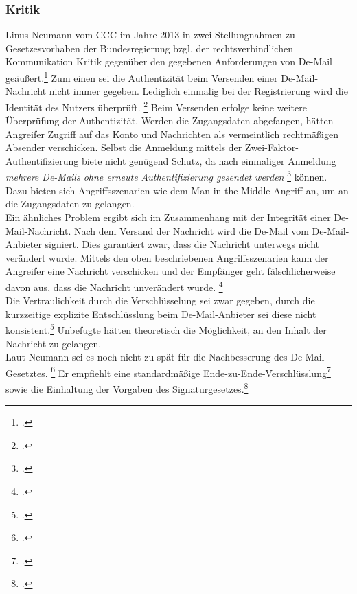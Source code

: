 \documentclass  [paper=a4,
				fontsize=12pt,
				listof=totoc,
				bibliography=totoc
				]{scrreprt}
\begin{document}
{			\subsubsection{Kritik}
			Linus Neumann vom \ac{CCC} im Jahre 2013 in zwei Stellungnahmen zu Gesetzesvorhaben der Bundesregierung bzgl. der rechtsverbindlichen Kommunikation Kritik gegenüber den gegebenen Anforderungen von De-Mail geäußert.\footcite[Vgl.][]{Neumann2013a,Neumann2013b} %
			Zum einen sei die Authentizität beim Versenden einer De-Mail-Nachricht nicht immer gegeben. Lediglich einmalig bei der Registrierung wird die Identität des Nutzers überprüft. \footcite[Vgl.][]{Neumann2013b} 
			Beim Versenden erfolge keine weitere Überprüfung der Authentizität.
			Werden die Zugangsdaten abgefangen, hätten Angreifer Zugriff auf das Konto und Nachrichten als vermeintlich rechtmäßigen Absender verschicken.
			Selbst die Anmeldung mittels der Zwei-Faktor-Authentifizierung biete nicht genügend Schutz, da nach einmaliger Anmeldung \textit{\glqq mehrere De-Mails ohne erneute Authentifizierung gesendet werden\grqq} \footcite[Vgl.][o.S.]{Neumann2013b} können.
			Dazu bieten sich Angriffsszenarien wie dem Man-in-the-Middle-Angriff an, um an die Zugangsdaten zu gelangen.\medskip\\
			
			Ein ähnliches Problem ergibt sich im Zusammenhang mit der Integrität einer De-Mail-Nachricht.
			Nach dem Versand der Nachricht wird die De-Mail vom De-Mail-Anbieter signiert.
			Dies garantiert zwar, dass die Nachricht unterwegs nicht verändert wurde.
			Mittels den oben beschriebenen Angriffsszenarien kann der Angreifer eine Nachricht verschicken und der Empfänger geht fälschlicherweise davon aus, dass die Nachricht unverändert wurde. \footcite[Vgl.][o.S.]{Neumann2013b}\medskip\\
			
			Die Vertraulichkeit durch die Verschlüsselung sei zwar gegeben, durch die kurzzeitige explizite Entschlüsslung beim De-Mail-Anbieter sei diese nicht konsistent.\footcite[Vgl.][S. 4]{Neumann2013a}
			Unbefugte hätten theoretisch die Möglichkeit, an den Inhalt der Nachricht zu gelangen.\medskip\\
			
			Laut Neumann sei es noch nicht zu spät für die Nachbesserung des De-Mail-Gesetztes. \footcite[Vgl.][S. 6f]{Neumann2013a}
			Er empfiehlt eine standardmäßige Ende-zu-Ende-Verschlüsslung\footcite[Vgl.][S. 7,o.S.]{Neumann2013a,Neumann2013b} sowie die Einhaltung der Vorgaben des Signaturgesetzes.\footcite[Vgl.][S. 4]{Neumann2013a}
				
}
\end{document}
